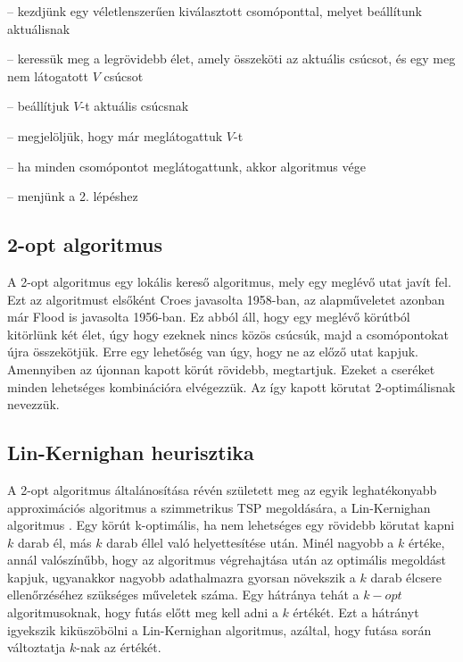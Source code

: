 \begin{description}
	\setlength{\itemsep}{0.04mm}
	\item[1. lépés] -- kezdjünk egy véletlenszerűen kiválasztott csomóponttal, melyet beállítunk aktuálisnak
	\item[2. lépés] -- keressük meg a legrövidebb élet, amely összeköti az aktuális csúcsot, és egy meg nem látogatott \(V\) csúcsot
	\item[3. lépés] -- beállítjuk \(V\)-t aktuális csúcsnak
	\item[4. lépés] -- megjelöljük, hogy már meglátogattuk \(V\)-t
	\item[5. lépés] -- ha minden csomópontot meglátogattunk, akkor algoritmus vége
	\item[6. lépés] -- menjünk a 2. lépéshez \cite{12}
\end{description}

\subsection{2-opt algoritmus}

A 2-opt algoritmus \cite{10} egy lokális kereső algoritmus, mely egy meglévő utat javít fel. Ezt az algoritmust elsőként Croes javasolta 1958-ban, az alapműveletet azonban már Flood is javasolta 1956-ban. Ez abból áll, hogy egy meglévő körútból kitörlünk két élet, úgy hogy ezeknek nincs közös csúcsúk, majd a csomópontokat újra összekötjük. Erre egy lehetőség van úgy, hogy ne az előző utat kapjuk. Amennyiben az újonnan kapott körút rövidebb, megtartjuk. Ezeket a cseréket minden lehetséges kombinációra elvégezzük. Az így kapott körutat 2-optimálisnak nevezzük.

\subsection{Lin-Kernighan heurisztika}

A 2-opt algoritmus általánosítása révén született meg az egyik leghatékonyabb approximációs algoritmus a szimmetrikus TSP megoldására, a Lin-Kernighan algoritmus \cite{11}. Egy körút k-optimális, ha nem lehetséges egy rövidebb körutat kapni \(k\) darab él, más \(k\) darab éllel való helyettesítése után. Minél nagyobb a \(k\) értéke, annál valószínűbb, hogy az algoritmus végrehajtása után az optimális megoldást kapjuk, ugyanakkor nagyobb adathalmazra gyorsan növekszik a \(k\) darab élcsere ellenőrzéséhez szükséges műveletek száma. Egy hátránya tehát a \(k-opt\) algoritmusoknak, hogy futás előtt meg kell adni a \(k\) értékét. Ezt a hátrányt igyekszik kiküszöbölni a Lin-Kernighan algoritmus, azáltal, hogy futása során változtatja \(k\)-nak az értékét.

